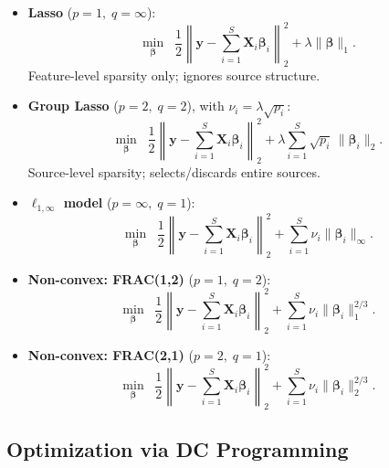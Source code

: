 \documentclass[11pt,a4paper]{article}
\begin{document}
\begin{itemize}
    \item \textbf{Lasso} ($p=1,\; q=\infty$):
    \begin{equation}
    \min_{\boldsymbol{\beta}} \;\; \frac{1}{2}\left\|\mathbf{y} - \sum_{i=1}^{S}\mathbf{X}_i\boldsymbol{\beta}_i\right\|_2^2 + \lambda\|\boldsymbol{\beta}\|_1.
    \end{equation}
    Feature-level sparsity only; ignores source structure.

    \item \textbf{Group Lasso} ($p=2,\; q=2$), with $\nu_i = \lambda\sqrt{p_i}$:
    \begin{equation}
    \min_{\boldsymbol{\beta}} \;\; \frac{1}{2}\left\|\mathbf{y} - \sum_{i=1}^{S}\mathbf{X}_i\boldsymbol{\beta}_i\right\|_2^2 + \lambda\sum_{i=1}^{S}\sqrt{p_i}\,\|\boldsymbol{\beta}_i\|_2.
    \end{equation}
    Source-level sparsity; selects/discards entire sources.

    \item \textbf{$\ell_{1,\infty}$ model} ($p=\infty,\; q=1$):
    \begin{equation}
    \min_{\boldsymbol{\beta}} \;\; \frac{1}{2}\left\|\mathbf{y} - \sum_{i=1}^{S}\mathbf{X}_i\boldsymbol{\beta}_i\right\|_2^2 + \sum_{i=1}^{S}\nu_i\|\boldsymbol{\beta}_i\|_\infty.
    \end{equation}

    \item \textbf{Non-convex: FRAC(1,2)} ($p=1,\; q=2$):
    \begin{equation}
    \min_{\boldsymbol{\beta}} \;\; \frac{1}{2}\left\|\mathbf{y} - \sum_{i=1}^{S}\mathbf{X}_i\boldsymbol{\beta}_i\right\|_2^2 + \sum_{i=1}^{S}\nu_i\|\boldsymbol{\beta}_i\|_1^{2/3}.
    \end{equation}

    \item \textbf{Non-convex: FRAC(2,1)} ($p=2,\; q=1$):
    \begin{equation}
    \min_{\boldsymbol{\beta}} \;\; \frac{1}{2}\left\|\mathbf{y} - \sum_{i=1}^{S}\mathbf{X}_i\boldsymbol{\beta}_i\right\|_2^2 + \sum_{i=1}^{S}\nu_i\|\boldsymbol{\beta}_i\|_2^{2/3}.
    \end{equation}
\end{itemize}

\subsection{Optimization via DC Programming}
\end{document}
